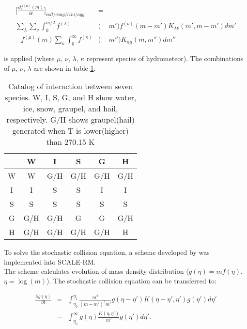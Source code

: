 \begin{eqnarray}
\Bigr[\frac{\partial f^{(\mu)}(m)}{\partial t}\Bigr]_{coll/coag/rim/agg}&=&\nonumber\\
\sum_{\lambda}\sum_{\nu}\int_{0}^{m/2}f^{(\lambda)}&(&m')f^{(\nu)}(m-m')K_{\lambda\nu}(m',m-m')dm' \nonumber\\
-f^{(\mu)}(m)\sum_{\kappa}\int_0^{\infty}f^{(\kappa)}&(&m'')K_{\kappa\mu}(m,m'')dm''\label{s10-16}
\end{eqnarray}

is applied (where $\mu$, $\nu$, $\lambda$, $\kappa$ represent species of hydrometeor). The combinations of $\mu$, $\nu$, $\lambda$ are shown in table \ref{table-s10-1}.

\begin{table}[h]
\begin{center}
\caption{Catalog of interaction between seven species. W, I, S, G, and H show water, ice, snow, graupel, and hail, respectively. G/H shows graupel(hail) generated when T is lower(higher) than 270.15 K}
\label{table-s10-1}
\begin{tabular}{cccccc}
\hline
     & W   & I   & S   & G   & H   \\ \hline\hline
W    & W   & G/H & G/H & G/H & G/H \\ \hline
I    & I   & S   & S   & I   & I   \\ \hline
S    & S   & S   & S   & S   & S   \\ \hline
G    & G/H & G/H & G   & G   & G/H \\ \hline
H    & G/H & G/H & G/H & G/H & H   \\ \hline
\end{tabular}
\end{center}
\end{table}


To solve the stochastic collision equation, a scheme developed by \cite{bott_1998} was implemented into SCALE-RM.\\
The \cite{bott_1998} scheme calculates evolution of mass density distribution ($g(\eta)=mf(\eta)$, $\eta=\log(m)$). The stochastic collision equation can be transferred to:

\begin{eqnarray}
\frac{\partial g(\eta)}{\partial t}&=&\int_{\eta_{0}}^{\eta_{1}}\frac{m^{2}}{(m-m')^{2} m'}g(\eta-\eta') K(\eta-\eta',\eta')g(\eta')d\eta' \nonumber\\
&-&\int_{\eta_{0}}^{\infty} g(\eta)\frac{K(\eta,\eta')}{m'}g(\eta')d\eta'.\label{s10-17}
\end{eqnarray}

